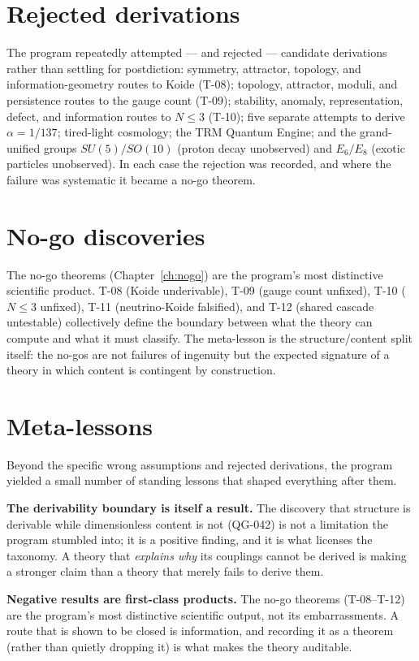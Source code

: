 \documentclass[10pt,twoside,openany]{book}
\begin{document}
\section{Rejected derivations}

The program repeatedly attempted --- and rejected --- candidate derivations rather than
settling for postdiction: symmetry, attractor, topology, and information-geometry routes
to Koide (T-08); topology, attractor, moduli, and persistence routes to the gauge count
(T-09); stability, anomaly, representation, defect, and information routes to $N\le3$
(T-10); five separate attempts to derive $\alpha=1/137$; tired-light cosmology; the TRM
Quantum Engine; and the grand-unified groups $SU(5)/SO(10)$ (proton decay unobserved) and
$E_6/E_8$ (exotic particles unobserved). In each case the rejection was recorded, and
where the failure was systematic it became a no-go theorem.

\section{No-go discoveries}

The no-go theorems (Chapter~\ref{ch:nogo}) are the program's most distinctive scientific
product. T-08 (Koide underivable), T-09 (gauge count unfixed), T-10 ($N\le3$ unfixed),
T-11 (neutrino-Koide falsified), and T-12 (shared cascade untestable) collectively define
the boundary between what the theory can compute and what it must classify. The
meta-lesson is the structure/content split itself: the no-gos are not failures of
ingenuity but the expected signature of a theory in which content is contingent by
construction.

\section{Meta-lessons}

Beyond the specific wrong assumptions and rejected derivations, the program yielded a
small number of standing lessons that shaped everything after them.

\textbf{The derivability boundary is itself a result.} The discovery that structure is
derivable while dimensionless content is not (QG-042) is not a limitation the program
stumbled into; it is a positive finding, and it is what licenses the taxonomy. A theory
that \emph{explains why} its couplings cannot be derived is making a stronger claim than a
theory that merely fails to derive them.

\textbf{Negative results are first-class products.} The no-go theorems (T-08--T-12) are
the program's most distinctive scientific output, not its embarrassments. A route that is
shown to be closed is information, and recording it as a theorem (rather than quietly
dropping it) is what makes the theory auditable.
\end{document}
